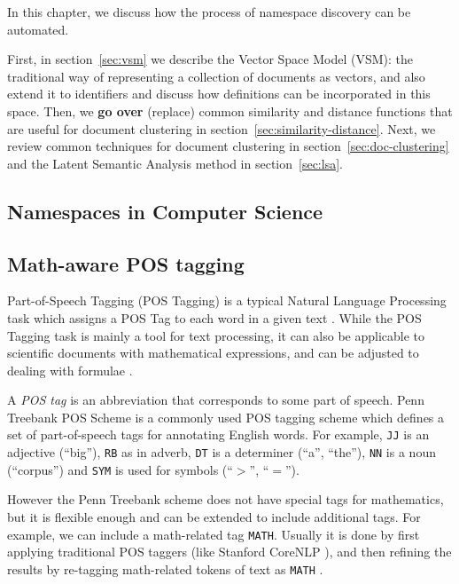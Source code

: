In this chapter, we discuss how the process of namespace discovery
can be automated.

First, in section~\ref{sec:vsm} we describe the Vector Space Model (VSM):
the traditional way of representing a collection of documents as vectors,
and also extend it to identifiers and discuss how definitions can
be incorporated in this space.
Then, we \textbf{go over } (replace) common similarity and distance functions that are useful
for document clustering in section~\ref{sec:similarity-distance}.
Next, we review common techniques for document clustering in section~\ref{sec:doc-clustering}
and the Latent Semantic Analysis method in section~\ref{sec:lsa}.


\subsection{Namespaces in Computer Science}



\subsection{Math-aware POS tagging} \label{sec:postagging}
Part-of-Speech Tagging (POS Tagging) is a typical Natural Language Processing
task which assigns a POS Tag to each word in a given text \cite{jurafsky2000speech}.
While the POS Tagging task is mainly a tool for text processing, it can
also be applicable to scientific documents with mathematical expressions,
and can be adjusted to dealing with formulae \cite{schoneberg2014pos}
\cite{pagael2014mlp}.

A \emph{POS tag} is an abbreviation that corresponds to some
part of speech. Penn Treebank POS Scheme \cite{santorini1990part} is
a commonly used POS tagging scheme which defines a set of part-of-speech tags
for annotating English words.
For example, \texttt{JJ} is an adjective (``big''), \texttt{RB} as in adverb,
\texttt{DT} is a determiner (``a'', ``the''), \texttt{NN} is a
noun (``corpus'') and \texttt{SYM} is used for symbols (``$>$'', ``$=$'').


However the Penn Treebank scheme does not have special tags for mathematics,
but it is flexible enough and can be extended to include additional tags.
For example, we can include a math-related tag \texttt{MATH}.
Usually it is done by first applying traditional POS taggers (like Stanford
CoreNLP \cite{manning2014stanford}), and then
refining the results by re-tagging math-related tokens of text as \texttt{MATH}
\cite{schoneberg2014pos}.


